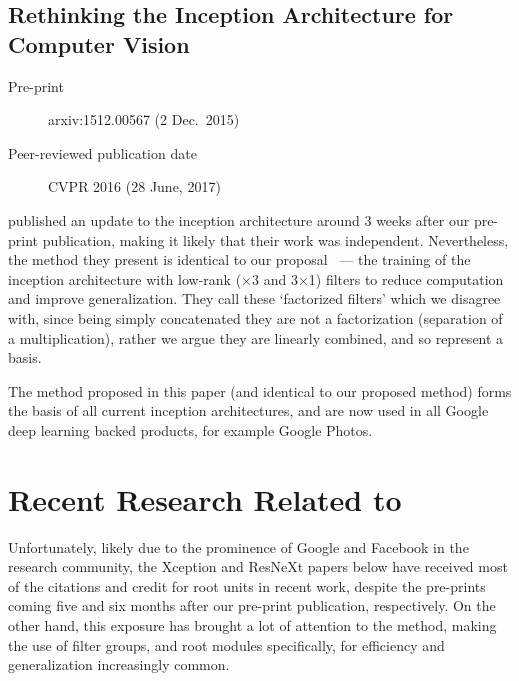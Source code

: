\documentclass[thesis]{subfiles}
\begin{document}
\subsection*{Rethinking the Inception Architecture for Computer Vision}
\begin{description}
    \item[Pre-print] arxiv:1512.00567 (2 Dec.\ 2015)
    \item[Peer-reviewed publication date] CVPR 2016 (28 June, 2017)
\end{description}
 published an update to the \Gls{inception} architecture around 3 weeks after our pre-print publication, making it likely that their work was independent. Nevertheless, the method they present is identical to our proposal~\citep{Ioannou2016} --- the training of the \Gls{inception} architecture with low-rank ($\times$3 and 3$\times$1) filters to reduce computation and improve generalization. They call these `factorized filters' which we disagree with, since being simply concatenated they are not a factorization (\ie separation of a multiplication), rather we argue they are linearly combined, and so represent a basis.

The method proposed in this paper (and identical to our proposed method) forms the basis of all current \Gls{inception} architectures, and are now used in all Google deep learning backed products, for example Google Photos\texttrademark.

\section{Recent Research Related to }
Unfortunately, likely due to the prominence of Google and Facebook in the research community, the Xception and ResNeXt papers below have received most of the citations and credit for root units in recent work, despite the pre-prints coming five and six months after our pre-print publication, respectively. On the other hand, this exposure has brought a lot of attention to the method, making the use of filter groups, and root modules specifically, for efficiency and generalization increasingly common. 
\end{document}

